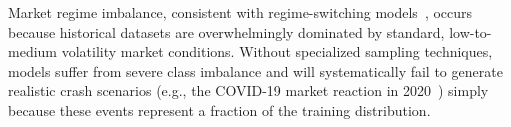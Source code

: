 Market regime imbalance, consistent with regime-switching models~\citep{hamilton1989new}, occurs because historical datasets are overwhelmingly dominated by standard, low-to-medium volatility market conditions. Without specialized sampling techniques, models suffer from severe class imbalance and will systematically fail to generate realistic crash scenarios (e.g., the COVID-19 market reaction in 2020~\citep{ramelli2020feverish}) simply because these events represent a fraction of the training distribution.
